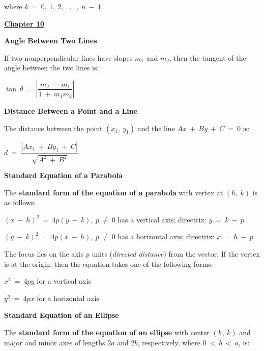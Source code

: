 \documentclass{article}
\begin{document}
\begin{large}
\hspace{0.1in} where $k\ =\ 0,\ 1,\ 2,\ .\ .\ .\ ,\ n\ -\ 1$

\underline{\textbf{\huge Chapter 10 \phantom{ } \phantom{ } \phantom{ } \phantom{ }}}

\textbf{Angle Between Two Lines}

\hspace{0.1in} If two nonperpendicular lines have slopes $m_{1}$ and $m_{2}$, then the tangent of the angle between the two lines is:

\hspace{2.5in} $\tan \ \theta\ =\ \left|\dfrac{m_{2}\ -\ m_{1}}{1\ +\ m_{1}m_{2}}\right|$

\textbf{Distance Between a Point and a Line}

\hspace{0.1in} The distance between the point $(x_{1},\ y_{1})$ and the line $Ax\ +\ By\ +\ C\ =\ 0$ is:

\hspace{2.5in} $d\ =\ \dfrac{|Ax_{1}\ +\ By_{1}\ +\ C|}{\sqrt{A^{2}\ +\ B^{2}}}$

\textbf{Standard Equation of a Parabola}

\hspace{0.1in} The \textbf{standard form of the equation of a parabola} with vertex at $(h,\ k)$ is as follows:

\hspace{0.5in} $(x\ -\ h)^{2}\ =\ 4p(y\ -\ k),\ p\ \neq\ 0$ has a vertical axis; directrix: $y\ =\ k\ -\ p$

\hspace{0.5in} $(y\ -\ k)^{2}\ =\ 4p(x\ -\ h),\ p\ \neq\ 0$ has a horizontal axis; directrix: $x\ =\ h\ -\ p$

\hspace{0.1in} The focus lies on the axis $p$ units (\textit{directed distance}) from the vector.  If the vertex is at the origin, then the equation takes one of the following forms:

\hspace{2.5in} $x^{2}\ =\ 4py$ for a vertical axis

\hspace{2.5in} $y^{2}\ =\ 4px$ for a horizontal axis

\textbf{Standard Equation of an Ellipse}

\hspace{0.1in} The \textbf{standard form of the equation of an ellipse} with center $(h,\ k)$ and major and minor axes of lengths $2a$ and $2b$, respectively, where $0\ <\ b\ <\ a$, is:


\end{large}
\end{document}
